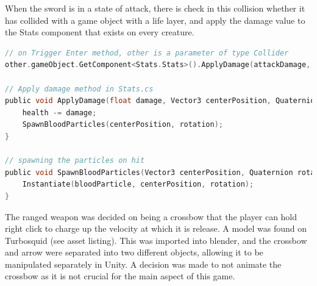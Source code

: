 \documentclass[12pt]{report}
\begin{document}
When the sword is in a state of attack, there is check in this collision whether it has collided with a game object with a life layer, and apply the damage value to the Stats component that exists on every creature.

\begin{lstlisting}[language=c]
// on Trigger Enter method, other is a parameter of type Collider
other.gameObject.GetComponent<Stats.Stats>().ApplyDamage(attackDamage, other.bounds.center, other.transform.rotation);

// Apply damage method in Stats.cs
public void ApplyDamage(float damage, Vector3 centerPosition, Quaternion rotation) {
    health -= damage;
    SpawnBloodParticles(centerPosition, rotation);
}

// spawning the particles on hit
public void SpawnBloodParticles(Vector3 centerPosition, Quaternion rotation) {
    Instantiate(bloodParticle, centerPosition, rotation);
}
\end{lstlisting}

The ranged weapon was decided on being a crossbow that the player can hold right click to charge up the velocity at which it is release. A model was found on Turbosquid (see asset listing). This was imported into blender, and the crossbow and arrow were separated into two different objects, allowing it to be manipulated separately in Unity. A decision was made to not animate the crossbow as it is not crucial for the main aspect of this game.
\end{document}
